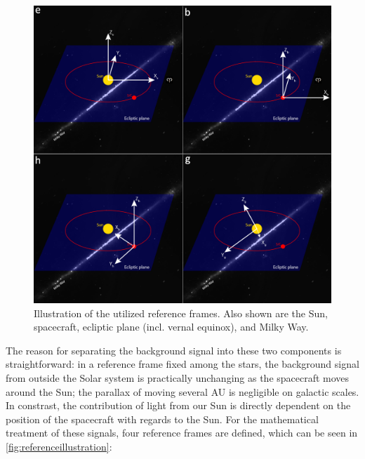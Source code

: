 \begin{figure}[htbp]
 \centering
 \includegraphics[width=1.0\textwidth]{img/referenceframes.png}
 \caption{Illustration of the utilized reference frames. Also shown are the Sun, spacecraft, ecliptic plane (incl. vernal equinox), and Milky Way.}
 \label{fig:referenceillustration}
\end{figure}


The reason for separating the background signal into these two components is straightforward: in a reference frame fixed among the stars, the background signal from outside the Solar system is practically unchanging as the spacecraft moves around the Sun; the parallax of moving several AU is negligible on galactic scales. In constrast, the contribution of light from our Sun is directly dependent on the position of the spacecraft with regards to the Sun. For the mathematical treatment of these signals, four reference frames are defined, which can be seen in \autoref{fig:referenceillustration}:

